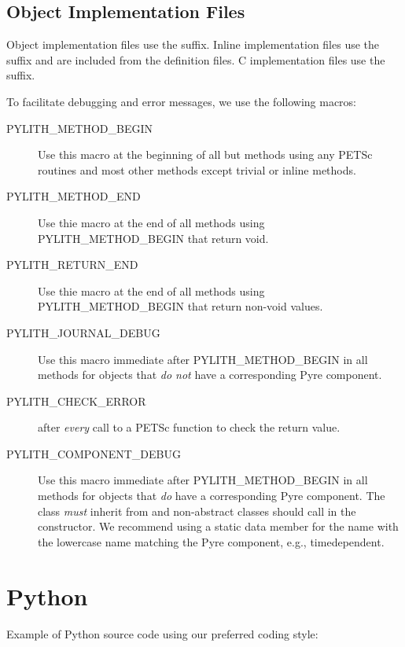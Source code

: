 
\subsection{Object Implementation Files}

Object implementation files use the  suffix. Inline
implementation files use the  suffix and are included
from the definition files. C implementation files use the 
suffix.

To facilitate debugging and error messages, we use the following
macros:
\begin{description}
\item[PYLITH\_METHOD\_BEGIN] Use this macro at the beginning of all
  but methods using any PETSc routines and most other methods except
  trivial or inline methods.
\item[PYLITH\_METHOD\_END] Use thie macro at the end of all methods
  using PYLITH\_METHOD\_BEGIN that return void.
\item[PYLITH\_RETURN\_END] Use thie macro at the end of all methods
  using PYLITH\_METHOD\_BEGIN that return non-void values.
\item[PYLITH\_JOURNAL\_DEBUG] Use this macro immediate after
  PYLITH\_METHOD\_BEGIN in all methods for objects that {\em do not} have a corresponding
  Pyre component.
\item[PYLITH\_CHECK\_ERROR] after {\em every} call to a PETSc function
  to check the return value.
\item[PYLITH\_COMPONENT\_DEBUG] Use this macro immediate after
  PYLITH\_METHOD\_BEGIN in all methods for objects that {\em do} have
  a corresponding Pyre component. The class {\em must} inherit from
   and non-abstract classes
  should call  in the constructor. We
  recommend using a static data member for the name with the lowercase
  name matching the Pyre component, e.g., timedependent.
\end{description}




\section{Python}

Example of Python source code using our preferred coding style:

